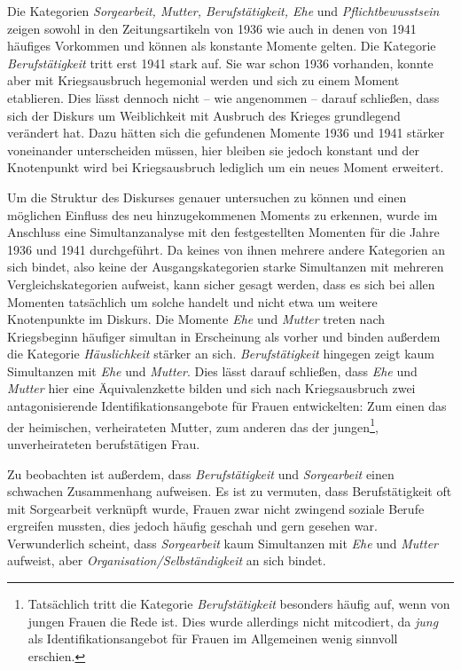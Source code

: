 \documentclass[12pt, titlepage=true, toc=bib]{scrartcl}
\begin{document}
Die Kategorien \textit{Sorgearbeit, Mutter, Berufstätigkeit, Ehe} und \textit{Pflichtbewusstsein} zeigen sowohl in den Zeitungsartikeln von 1936 wie auch in denen von 1941 häufiges Vorkommen und können als konstante Momente gelten. Die Kategorie \textit{Berufstätigkeit} tritt erst 1941 stark auf. Sie war schon 1936 vorhanden, konnte aber mit Kriegsausbruch hegemonial werden und sich zu einem Moment etablieren. Dies lässt dennoch nicht -- wie angenommen -- darauf schließen, dass sich der Diskurs um Weiblichkeit mit Ausbruch des Krieges grundlegend verändert hat. Dazu hätten sich die gefundenen Momente 1936 und 1941 stärker voneinander unterscheiden müssen, hier bleiben sie jedoch konstant und der Knotenpunkt wird bei Kriegsausbruch lediglich um ein neues Moment erweitert.

Um die Struktur des Diskurses genauer untersuchen zu können und einen möglichen Einfluss des neu hinzugekommenen Moments zu erkennen, wurde im Anschluss eine Simultanzanalyse mit den festgestellten Momenten für die Jahre 1936 und 1941 durchgeführt. Da keines von ihnen mehrere andere Kategorien an sich bindet, also keine der Ausgangskategorien starke Simultanzen mit mehreren Vergleichskategorien aufweist, kann sicher gesagt werden, dass es sich bei allen Momenten tatsächlich um solche handelt und nicht etwa um weitere Knotenpunkte im Diskurs. Die Momente \textit{Ehe} und \textit{Mutter} treten nach Kriegsbeginn häufiger simultan in Erscheinung als vorher und binden außerdem die Kategorie \textit{Häuslichkeit} stärker an sich. \textit{Berufstätigkeit} hingegen zeigt kaum Simultanzen mit \textit{Ehe} und \textit{Mutter}. Dies lässt darauf schließen, dass \textit{Ehe} und \textit{Mutter} hier eine Äquivalenzkette bilden und sich nach Kriegsausbruch zwei antagonisierende Identifikationsangebote für Frauen entwickelten: Zum einen das der heimischen, verheirateten Mutter, zum anderen das der jungen\footnote{Tatsächlich tritt die Kategorie \textit{Berufstätigkeit} besonders häufig auf, wenn von jungen Frauen die Rede ist. Dies wurde allerdings nicht mitcodiert, da \textit{jung} als Identifikationsangebot für Frauen im Allgemeinen wenig sinnvoll erschien.}, unverheirateten berufstätigen Frau. 

Zu beobachten ist außerdem, dass \textit{Berufstätigkeit} und \textit{Sorgearbeit} einen schwachen Zusammenhang aufweisen. Es ist zu vermuten, dass Berufstätigkeit oft mit Sorgearbeit verknüpft wurde, Frauen zwar nicht zwingend soziale Berufe ergreifen mussten, dies jedoch häufig geschah und gern gesehen war. Verwunderlich scheint, dass \textit{Sorgearbeit} kaum Simultanzen mit \textit{Ehe} und \textit{Mutter} aufweist, aber \textit{Organisation/Selbständigkeit} an sich bindet. 
\end{document}
